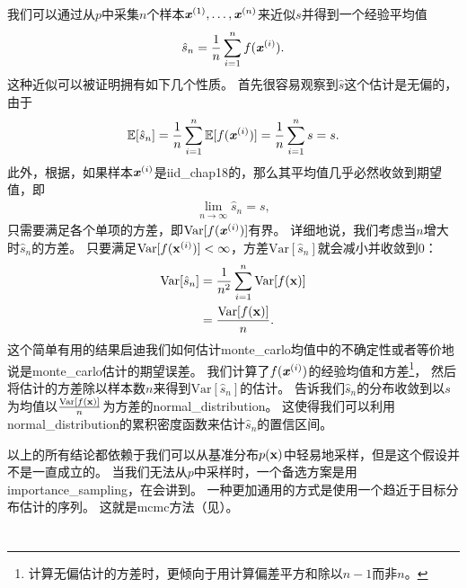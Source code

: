 我们可以通过从$p$中采集$n$个样本$\boldsymbol{\mathit{x}}^{(1)},\ldots,\boldsymbol{\mathit{x}}^{(n)}$来近似$s$并得到一个经验平均值
\begin{align}	
\hat{s}_n = \frac{1}{n}\sum_{i=1}^{n}f(\boldsymbol{\mathit{x}}^{(i)}).
\end{align}
这种近似可以被证明拥有如下几个性质。
首先很容易观察到$\hat{s}$这个估计是无偏的，由于
\begin{align}
\mathbb{E}[\hat{s}_n] = \frac{1}{n}\sum_{i=1}^{n}\mathbb{E}[f(\boldsymbol{\mathit{x}}^{(i)})] = \frac{1}{n}\sum_{i=1}^{n}s = s.
\end{align}
此外，根据，如果样本$\boldsymbol{\mathit{x}}^{(i)}$是\gls{iid_chap18}的，那么其平均值几乎必然收敛到期望值，即
\begin{align}
\lim_{n\xrightarrow{}\infty} \hat{s}_n = s,
\end{align}
只需要满足各个单项的方差，即$\text{Var}[f(\boldsymbol{\mathit{x}}^{(i)})]$有界。
详细地说，我们考虑当$n$增大时$\hat{s}_n$的方差。
只要满足$\text{Var}[f(\mathbf{x}^{(i)})]<\infty$，方差$\text{Var}[\hat{s}_n]$就会减小并收敛到$0$：
\begin{align}
\text{Var}[\hat{s}_n] & = \frac{1}{n^2}\sum_{i=1}^{n}\text{Var}[f(\mathbf{x})]\\
&  = \frac{\text{Var}[f(\mathbf{x})]}{n}.
\end{align}
这个简单有用的结果启迪我们如何估计\gls{monte_carlo}均值中的不确定性或者等价地说是\gls{monte_carlo}估计的期望误差。
我们计算了$f(\boldsymbol{\mathit{x}}^{(i)})$的经验均值和方差\footnote{计算无偏估计的方差时，更倾向于用计算偏差平方和除以$n-1$而非$n$。}，
然后将估计的方差除以样本数$n$来得到$\text{Var}[\hat{s}_n]$的估计。
告诉我们$\hat{s}_n$的分布收敛到以$s$为均值以$\frac{\text{Var}[f(\mathbf{x})]}{n}$为方差的\gls{normal_distribution}。
这使得我们可以利用\gls{normal_distribution}的累积密度函数来估计$\hat{s}_n$的置信区间。


以上的所有结论都依赖于我们可以从基准分布$p(\mathbf{x})$中轻易地采样，但是这个假设并不是一直成立的。
当我们无法从$p$中采样时，一个备选方案是用\gls{importance_sampling}，在会讲到。
一种更加通用的方式是使用一个趋近于目标分布估计的序列。
这就是\gls{mcmc}方法（见）。

\section{}
\label{sec:importance_sampling_chap17}

